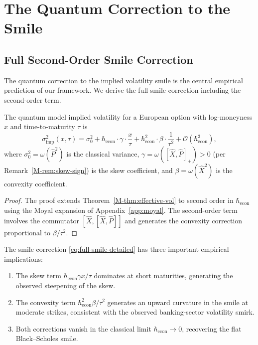 
\section{The Quantum Correction to the Smile}\label{app:smile-correction}

\subsection{Full Second-Order Smile Correction}

The quantum correction to the implied volatility smile is the central empirical
prediction of our framework. We derive the full smile correction including the
second-order term.

\begin{theorem}\label{thm:full-smile}
The quantum model implied volatility for a European option with log-moneyness $x$
and time-to-maturity $\tau$ is
\begin{equation}\label{eq:full-smile-detailed}
    \sigma_{\mathrm{imp}}^2(x, \tau) = \sigma_0^2
    + \hbar_{\mathrm{econ}} \cdot \gamma \cdot \frac{x}{\tau}
    + \hbar_{\mathrm{econ}}^2 \cdot \beta \cdot \frac{1}{\tau^2}
    + \mathcal{O}(\hbar_{\mathrm{econ}}^3),
\end{equation}
where $\sigma_0^2 = \omega(\hat{P}^2)$ is the classical variance,
$\gamma = \omega([\hat{X}, \hat{P}]_+) > 0$ (per Remark~\ref{M-rem:skew-sign}) is
the skew coefficient, and $\beta = \omega(\hat{X}^2)$ is the convexity
coefficient.
\end{theorem}

\begin{proof}
The proof extends Theorem~\ref{M-thm:effective-vol} to second order in
$\hbar_{\mathrm{econ}}$ using the Moyal expansion of Appendix~\ref{app:moyal}.
The second-order term involves the commutator $[\hat{X}, [\hat{X}, \hat{P}]]$
and generates the convexity correction proportional to $\beta / \tau^2$.
\end{proof}

\begin{remark}\label{rem:smile-empirical}
The smile correction \eqref{eq:full-smile-detailed} has three important
empirical implications:
\begin{enumerate}
    \item[(i)] The skew term $\hbar_{\mathrm{econ}} \gamma x / \tau$ dominates
        at short maturities, generating the observed steepening of the skew.
    \item[(ii)] The convexity term $\hbar_{\mathrm{econ}}^2 \beta / \tau^2$
        generates an upward curvature in the smile at moderate strikes,
        consistent with the observed banking-sector volatility smirk.
    \item[(iii)] Both corrections vanish in the classical limit
        $\hbar_{\mathrm{econ}} \to 0$, recovering the flat Black--Scholes smile.
\end{enumerate}
\end{remark}

